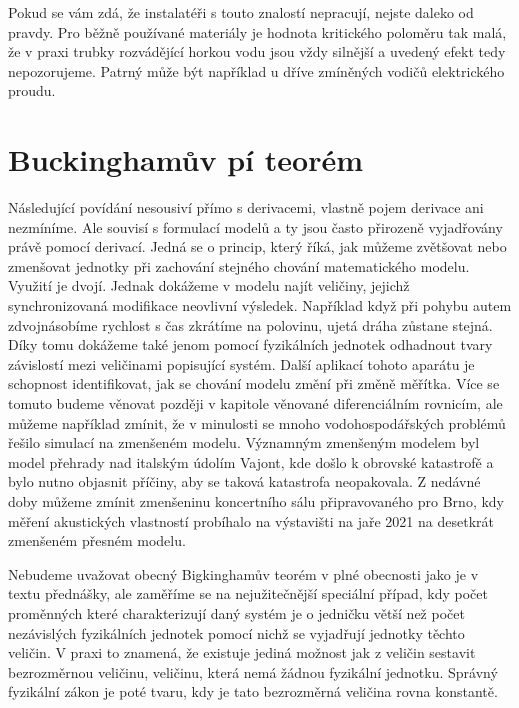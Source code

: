 \documentclass[12pt]{article}
\begin{document}
Pokud se vám zdá, že instalatéři s touto znalostí nepracují, nejste daleko od pravdy. Pro běžně používané materiály je hodnota kritického poloměru tak malá, že v praxi trubky rozvádějící horkou vodu jsou vždy silnější a uvedený efekt tedy nepozorujeme. Patrný může být například u dříve zmíněných vodičů elektrického proudu. 




\section*{Buckinghamův pí teorém}

Následující povídání nesousiví přímo s derivacemi, vlastně pojem derivace ani nezmíníme. Ale souvisí s formulací modelů a ty jsou často přirozeně vyjadřovány právě pomocí derivací. Jedná se o princip, který říká, jak můžeme zvětšovat nebo zmenšovat jednotky při zachování stejného chování matematického modelu. Využití je dvojí. Jednak dokážeme v modelu najít veličiny, jejichž synchronizovaná modifikace neovlivní výsledek. Například když při pohybu autem zdvojnásobíme rychlost s čas zkrátíme na polovinu, ujetá dráha zůstane stejná. Díky tomu dokážeme také jenom pomocí fyzikálních jednotek odhadnout tvary závislostí mezi veličinami popisující systém. Další aplikací tohoto aparátu je schopnost identifikovat, jak se chování modelu změní při změně měřítka. Více se tomuto budeme věnovat později v kapitole věnované diferenciálním rovnicím, ale můžeme například zmínit, že v minulosti se mnoho vodohospodářských problémů řešilo simulací na zmenšeném modelu. Významným zmenšeným modelem byl model přehrady nad italským údolím Vajont, kde došlo k obrovské katastrofě a bylo nutno objasnit příčiny, aby se taková katastrofa neopakovala. Z nedávné doby můžeme zmínit zmenšeninu koncertního sálu připravovaného pro Brno, kdy měření akustických vlastností probíhalo na výstavišti na jaře 2021 na desetkrát zmenšeném přesném modelu.

Nebudeme uvažovat obecný Bigkinghamův teorém v plné obecnosti jako je v textu přednášky, ale zaměříme se na nejužitečnější speciální případ, kdy počet proměnných které charakterizují daný systém je o jedničku větší než počet nezávislých fyzikálních jednotek pomocí nichž se vyjadřují jednotky těchto veličin. V praxi to znamená, že existuje jediná možnost jak z veličin sestavit bezrozměrnou veličinu, veličinu, která nemá žádnou fyzikální jednotku. Správný fyzikální zákon je poté tvaru, kdy je tato bezrozměrná veličina rovna konstantě.
\end{document}
